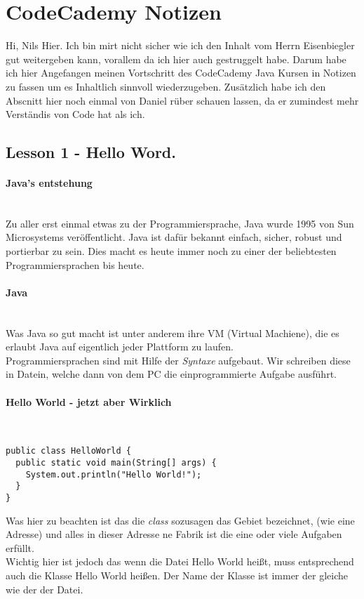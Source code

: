 \section{CodeCademy Notizen}

Hi, Nils Hier. Ich bin mirt nicht sicher wie ich den Inhalt vom Herrn Eisenbiegler gut weitergeben kann, vorallem da ich hier auch gestruggelt habe. Darum habe ich hier Angefangen meinen Vortschritt des CodeCademy Java Kursen in Notizen zu fassen um es Inhaltlich sinnvoll wiederzugeben. Zusätzlich habe ich den Abscnitt hier noch einmal von Daniel rüber schauen lassen, da er zumindest mehr Verständis von Code hat als ich.

\subsection{Lesson 1 - Hello Word.}
\paragraph{Java's entstehung}~\\
Zu aller erst einmal etwas zu der Programmiersprache, Java wurde 1995 von Sun Microsystems veröffentlicht. Java ist dafür bekannt einfach, sicher, robust und portierbar zu sein. Dies macht es heute immer noch zu einer der beliebtesten Programmiersprachen bis heute.

\paragraph{Java}~\\
Was Java so gut macht ist unter anderem ihre VM (Virtual Machiene), die es erlaubt Java auf eigentlich jeder Plattform zu laufen.\\
Programmiersprachen sind mit Hilfe der \textit{Syntaxe} aufgebaut. Wir schreiben diese in Datein, welche dann von dem PC die einprogrammierte Aufgabe ausführt. 

\paragraph{Hello World - jetzt aber Wirklich}~\\
\begin{verbatim}
public class HelloWorld {
  public static void main(String[] args) {
    System.out.println("Hello World!");
  }
}
\end{verbatim}

Was hier zu beachten ist das die \textit{class} sozusagen das Gebiet bezeichnet, (wie eine Adresse) und alles in dieser Adresse ne Fabrik ist die eine oder viele Aufgaben erfüllt.\\
Wichtig hier ist jedoch das wenn die Datei \glqq Hello World \grqq heißt, muss entsprechend auch die Klasse \glqq Hello World \grqq heißen. Der Name der Klasse ist immer der gleiche wie der der Datei. 

